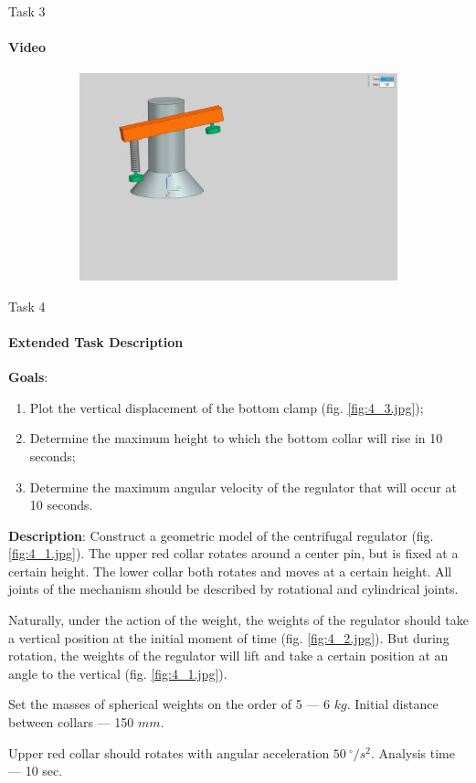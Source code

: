 \documentclass[aspectratio=169]{beamer}
\begin{document}
\begin{frame}[t]{Task 3}
    \framesubtitle{Video}
    \vspace{-0.6cm}
    \begin{figure}[H]
        \href{https://disk.yandex.ru/i/Hw4DpScaAzPctg}{
            \centering\includegraphics[height=6cm,width=1\textwidth,keepaspectratio]{3_preview.png}}
        \label{fig:3_preview.png}
    \end{figure}
\end{frame}

\begin{frame}[t]{Task 4}
    \framesubtitle{Extended Task Description}
    \footnotesize
    \vspace{-0.3cm}

    \textbf{Goals}:
    \begin{enumerate}
        \footnotesize
        \item Plot the vertical displacement of the bottom clamp (fig. \ref{fig:4_3.jpg});
        \item Determine the maximum height to which the bottom collar will rise in 10 seconds;
        \item Determine the maximum angular velocity of the regulator that will occur at 10 seconds.
    \end{enumerate}
    \smallskip

    \textbf{Description}: Construct a geometric model of the centrifugal regulator (fig. \ref{fig:4_1.jpg}). The upper red collar rotates around a center pin, but is fixed at a certain height. The lower collar both rotates and moves at a certain height. All joints of the mechanism should be described by rotational and cylindrical joints.
    \smallskip

    Naturally, under the action of the weight, the weights of the regulator should take a vertical position at the initial moment of time (fig. \ref{fig:4_2.jpg}). But during rotation, the weights of the regulator will lift and take a certain position at an angle to the vertical (fig. \ref{fig:4_1.jpg}).
    
    Set the masses of spherical weights on the order of 5 --- 6 $kg$. Initial distance between collars --- 150 $mm$.

    Upper red collar should rotates with angular acceleration $50\ ^\circ /s^2$. Analysis time --- 10 sec.
\end{frame}
\end{document}
